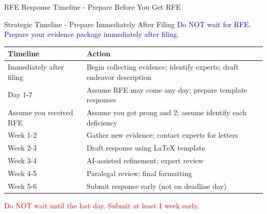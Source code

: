 \documentclass[11pt]{beamer}
\begin{document}
	\begin{frame}{RFE Response Timeline - Prepare Before You Get RFE}
		\scriptsize
		\begin{block}{Strategic Timeline - Prepare Immediately After Filing}
			\textcolor{blue}{Do NOT wait for RFE. Prepare your evidence package immediately after filing.}
			\vspace{0.2cm}
			\begin{tabular}{|p{3cm}|p{6cm}|}
				\hline
				\textbf{Timeline} & \textbf{Action} \\
				\hline
				Immediately after filing & Begin collecting evidence; identify experts; draft endeavor description \\
				\hline
				Day 1-7 & Assume RFE may come any day; prepare template responses \\
				\hline
				Assume you received RFE & Assume you got prong and 2; assume identify each deficiency \\
				\hline
				Week 1-2 & Gather new evidence; contact experts for letters \\
				\hline
				Week 2-3 & Draft response using LaTeX template \\
				\hline
				Week 3-4 & AI-assisted refinement; expert review \\
				\hline
				Week 4-5 & Paralegal review; final formatting \\
				\hline
				Week 5-6 & Submit response early (not on deadline day) \\
				\hline
			\end{tabular}
			\vspace{0.2cm}
			\textcolor{red}{Do NOT wait until the last day. Submit at least 1 week early.}
		\end{block}
	\end{frame}
	
\end{document}
